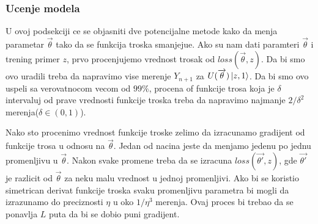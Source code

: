 \documentclass[12pt, letterpaper, oneside]{article}
\begin{document}
\subsubsection{Ucenje modela}
U ovoj podsekciji ce se objasniti dve potencijalne metode kako da menja parametar $\overrightarrow{\theta}$ tako da se funkcija troska smanjejue.
Ako su nam dati paramteri $\overrightarrow{\theta}$ i trening primer $z$, prvo procenjujemo vrednost trosak od $\mathit{loss}(\overrightarrow{\theta},z)$.
Da bi smo ovo uradili treba da napravimo vise merenje $Y_{n+1}$ za $U(\overrightarrow{\theta})\Ket{z,1}$.
Da bi smo ovo uspeli sa verovatnocom vecom od $99\%$, procena of funkcije trosa koja je $\delta$ intervaluj od prave vrednosti funkcije troska
treba da napravimo najmanje $2/\delta^2$ merenja($\delta \in (0,1)$).

Nako sto procenimo vrednost funkcije troske zelimo da izracunamo gradijent od funkcije trosa u odnosu na $\overrightarrow{\theta}$.
Jedan od nacina jeste da menjamo jedenu po jednu promenljivu u $\overrightarrow{\theta}$. Nakon svake promene treba da se izracuna
$\mathit{loss}(\overrightarrow{\theta'},z)$, gde $\overrightarrow{\theta'}$ je razlicit od $\overrightarrow{\theta}$ za neku malu vrednost u jednoj promenljivi.
Ako bi se koristio simetrican derivat funkcije troska svaku promenljivu parametra bi mogli da izrazunamo do preciznosti $\eta$ u oko $1/\eta^3$ merenja.
Ovaj proces bi trebao da se ponavlja $L$ puta da bi se dobio puni gradijent.
\end{document}
